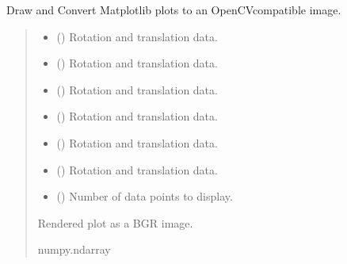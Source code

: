 \documentclass[letterpaper,10pt,english]{sphinxmanual}
\begin{document}
\begin{fulllineitems}
\label{\detokenize{PoseEstimator:PoseEstimator.pose_estimator.plot_to_image}}
\pysigstartsignatures
{}
\pysigstopsignatures
\sphinxAtStartPar
Draw and Convert Matplotlib plots to an OpenCV\sphinxhyphen{}compatible image.
\begin{quote}\begin{description}
\begin{itemize}
\item {} 
\sphinxAtStartPar
{} () \textendash{} Rotation and translation data.

\item {} 
\sphinxAtStartPar
{} () \textendash{} Rotation and translation data.

\item {} 
\sphinxAtStartPar
{} () \textendash{} Rotation and translation data.

\item {} 
\sphinxAtStartPar
{} () \textendash{} Rotation and translation data.

\item {} 
\sphinxAtStartPar
{} () \textendash{} Rotation and translation data.

\item {} 
\sphinxAtStartPar
{} () \textendash{} Rotation and translation data.

\item {} 
\sphinxAtStartPar
{} () \textendash{} Number of data points to display.

\end{itemize}

\sphinxAtStartPar
Rendered plot as a BGR image.

\sphinxAtStartPar
numpy.ndarray

\end{description}\end{quote}

\end{fulllineitems}
\end{document}
